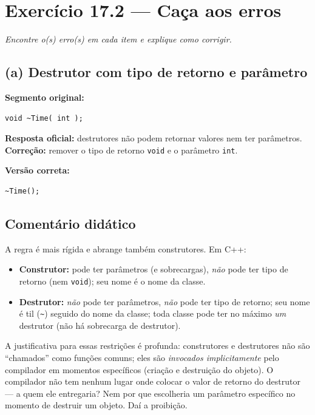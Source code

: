 \documentclass[11pt,a4paper]{article}
\begin{document}
\section{Exerc\'icio 17.2 --- Ca\c{c}a aos erros}

\textit{Encontre o(s) erro(s) em cada item e explique como corrigir.}

\subsection*{(a) Destrutor com tipo de retorno e par\^ametro}

\textbf{Segmento original:}
\begin{lstlisting}[style=cppcode,numbers=none]
void ~Time( int );
\end{lstlisting}

\begin{resposta}
\textbf{Resposta oficial:} destrutores n\~ao podem retornar valores nem ter par\^ametros. \textbf{Corre\c{c}\~ao:} remover o tipo de retorno \texttt{void} e o par\^ametro \texttt{int}.
\end{resposta}

\textbf{Vers\~ao correta:}
\begin{lstlisting}[style=cppcode,numbers=none]
~Time();
\end{lstlisting}

\subsection*{Coment\'ario did\'atico}

A regra \'e mais r\'igida e abrange tamb\'em construtores. Em C++:

\begin{itemize}[leftmargin=*,itemsep=0pt]
  \item \textbf{Construtor:} pode ter par\^ametros (e sobrecargas), \emph{n\~ao} pode ter tipo de retorno (nem \texttt{void}); seu nome \'e o nome da classe.
  \item \textbf{Destrutor:} \emph{n\~ao} pode ter par\^ametros, \emph{n\~ao} pode ter tipo de retorno; seu nome \'e til (\texttt{\~{}}) seguido do nome da classe; toda classe pode ter no m\'aximo \emph{um} destrutor (n\~ao h\'a sobrecarga de destrutor).
\end{itemize}

\begin{obseng}
A justificativa para essas restri\c{c}\~oes \'e profunda: construtores e destrutores n\~ao s\~ao ``chamados'' como fun\c{c}\~oes comuns; eles s\~ao \emph{invocados implicitamente} pelo compilador em momentos espec\'ificos (cria\c{c}\~ao e destrui\c{c}\~ao do objeto). O compilador n\~ao tem nenhum lugar onde colocar o valor de retorno do destrutor --- a quem ele entregaria? Nem por que escolheria um par\^ametro espec\'ifico no momento de destruir um objeto. Da\'i a proibi\c{c}\~ao.
\end{obseng}
\end{document}

